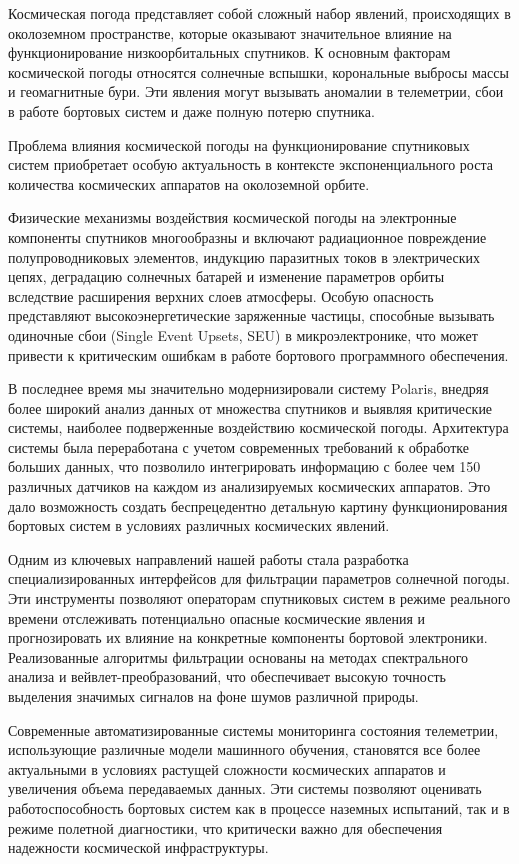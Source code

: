 
Космическая погода представляет собой сложный набор явлений, происходящих в
околоземном пространстве, которые оказывают значительное влияние на
функционирование низкоорбитальных спутников. К основным факторам космической
погоды относятся солнечные вспышки, корональные выбросы массы и геомагнитные
бури. Эти явления могут вызывать аномалии в телеметрии, сбои в работе бортовых
систем и даже полную потерю спутника.

Проблема влияния космической погоды на функционирование спутниковых систем
приобретает особую актуальность в контексте экспоненциального роста количества
космических аппаратов на околоземной орбите.

Физические механизмы воздействия космической погоды на электронные компоненты
спутников многообразны и включают радиационное повреждение полупроводниковых
элементов, индукцию паразитных токов в электрических цепях, деградацию солнечных
батарей и изменение параметров орбиты вследствие расширения верхних слоев
атмосферы. Особую опасность представляют высокоэнергетические заряженные
частицы, способные вызывать одиночные сбои (Single Event Upsets, SEU) в
микроэлектронике, что может привести к критическим ошибкам в работе бортового
программного обеспечения.

В последнее время мы значительно модернизировали систему Polaris, внедряя более
широкий анализ данных от множества спутников и выявляя критические системы,
наиболее подверженные воздействию космической погоды. Архитектура системы была
переработана с учетом современных требований к обработке больших данных, что
позволило интегрировать информацию с более чем 150 различных датчиков на каждом
из анализируемых космических аппаратов. Это дало возможность создать
беспрецедентно детальную картину функционирования бортовых систем в условиях
различных космических явлений.

Одним из ключевых направлений нашей работы стала разработка специализированных
интерфейсов для фильтрации параметров солнечной погоды. Эти инструменты
позволяют операторам спутниковых систем в режиме реального времени отслеживать
потенциально опасные космические явления и прогнозировать их влияние на
конкретные компоненты бортовой электроники. Реализованные алгоритмы фильтрации
основаны на методах спектрального анализа и вейвлет-преобразований, что
обеспечивает высокую точность выделения значимых сигналов на фоне шумов
различной природы.

Современные автоматизированные системы мониторинга состояния телеметрии,
использующие различные модели машинного обучения, становятся все более
актуальными в условиях растущей сложности космических аппаратов и увеличения
объема передаваемых данных. Эти системы позволяют оценивать работоспособность
бортовых систем как в процессе наземных испытаний, так и в режиме полетной
диагностики, что критически важно для обеспечения надежности космической
инфраструктуры.

